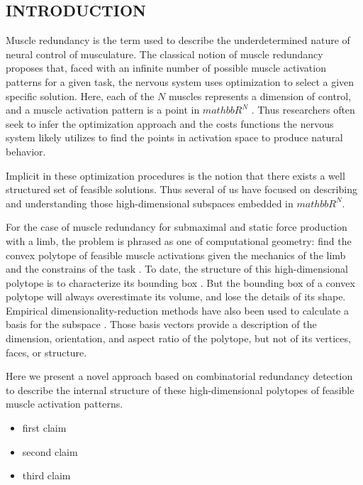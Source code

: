 \begin{introduction}
\section{INTRODUCTION}

Muscle redundancy is the term used to describe the underdetermined nature of neural control of musculature.
The classical notion of muscle redundancy  proposes that, faced with an infinite number of possible muscle activation patterns for a given task, the nervous system uses optimization to select a given specific solution.
Here, each of the $N$ muscles represents a dimension of control, and a muscle activation pattern is a point in $mathbb{R}^N$ \cite{Valero-Cuevas1998Large}.
Thus researchers often seek to infer the optimization approach and the costs functions the nervous system likely utilizes to find the points in activation space to produce natural behavior\cite{Chao1978Graphical,Prilutsky2000Muscle,scott2004optimal,todorov2002optimal,crowninshield1981physiologically,higginson2005simulated}. 


Implicit in these optimization procedures is the notion that there exists a well structured set of feasible solutions. Thus several of us have focused on describing and understanding those high-dimensional subspaces  embedded in $mathbb{R}^N$\cite{kutch2011muscle,kutch2012challenges,sohn2013cat_bounding_box,Valero-Cuevas1998Large,Valero-Cuevas2015high-dimensional}.

For the case of muscle redundancy for submaximal and static force production with a limb,  the problem is phrased as one of computational geometry: find the convex polytope of feasible muscle activations given the mechanics of the limb and the constrains of the task \cite{avis1992Pivoting,Valero-Cuevas1998Large,Valero-Cuevas2009mathematical,Valero-Cuevas2015high-dimensional}.  To date, the structure of this high-dimensional polytope is to characterize its bounding box \cite{kutch2011muscle,sohn2013cat_bounding_box,Valero-Cuevas2015high-dimensional}.  But the bounding box of a convex polytope will always overestimate its volume, and lose the details of its shape.  Empirical dimensionality-reduction methods have also been used to calculate a basis for the subspace \cite{Clewley2008Estimating,davella2005shared,krishnamoorthy2003muscle}. Those basis vectors  provide a description of the dimension, orientation, and aspect ratio of the polytope, but not of its vertices, faces, or structure.

Here we present a novel approach based on combinatorial redundancy detection \cite{fukuda2014combinatorial} to describe the internal structure of these high-dimensional polytopes of feasible muscle activation patterns.
\begin{itemize}

\item first claim
\item second claim
\item third claim

\end{itemize}

\end{introduction}